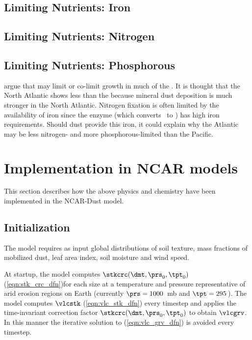 \documentclass[12pt,twoside]{book}
\begin{document}
\section{Limiting Nutrients: Iron}\label{sxn:lmt_ntr_Fe}

\section{Limiting Nutrients: Nitrogen}\label{sxn:lmt_ntr_N}

\section{Limiting Nutrients: Phosphorous}\label{sxn:lmt_ntr_P}

\cite{AHC03} argue that  may limit or
co-limit  growth in much of the . 
It is thought that the North Atlantic shows less  than the  because mineral dust
deposition is much stronger in the North Atlantic.
Nitrogen fixation is often limited by the availability of iron since
the enzyme  (which converts \Nd\ to \NHq) has high
iron requirements. 
Should dust provide this iron, it could explain why the Atlantic may
be less nitrogen- and more phosphorous-limited than the Pacific.

\chapter[Implementation in NCAR models]{Implementation in NCAR models}\label{sxn:mpl}

This section describes how the above physics and chemistry have been 
implemented in the NCAR-Dust model.

\section{Initialization}\label{sxn:ini}
The model requires as input global distributions of soil texture, mass
fractions of mobilized dust, leaf area index, soil moisture and
wind speed. 

At startup, the model computes $\stkcrc(\dmt,\prs_{0},\tpt_{0})$
(\ref{eqn:stk_crc_dfn})for each size at a temperature and pressure
representative of arid erosion regions on Earth (currently $\prs =
1000$~mb and $\tpt = 295$\,\K).  
The model computes $\vlcstk$ (\ref{eqn:vlc_stk_dfn}) every timestep
and applies the time-invariant correction factor
$\stkcrc(\dmt,\prs_{0},\tpt_{0})$ to obtain $\vlcgrv$.
In this manner the iterative solution to (\ref{eqn:vlc_grv_dfn}) is
avoided every timestep.
\end{document}

